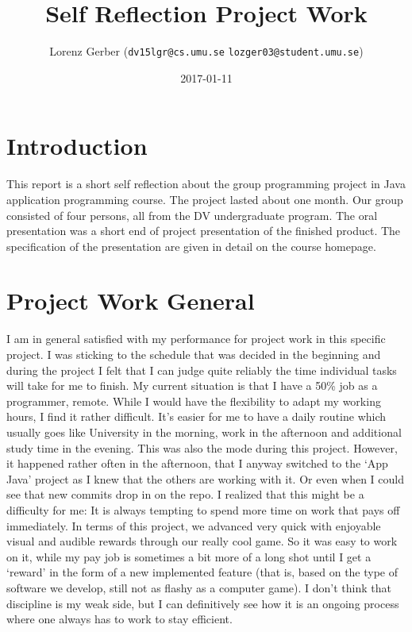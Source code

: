 \documentclass[a4paper,11pt,twoside]{article}
\title{Self Reflection Project Work}
\author{Lorenz Gerber ({\tt{dv15lgr@cs.umu.se}} {\tt{lozger03@student.umu.se}})}
\date{2017-01-11}
\begin{document}
\lstset{language=C}
\maketitle
\thispagestyle{empty}
\newpage
\tableofcontents
\thispagestyle{empty}
\newpage

\clearpage
{}

\section{Introduction}
This report is a short self reflection about the group programming project in Java application programming course. The project lasted about one month. Our group consisted of four persons, all from the DV undergraduate program. The oral presentation was a short end of project presentation of the finished product. The specification of the presentation are given in detail on the course homepage.

\section{Project Work General}
I am in general satisfied with my performance for project work in this specific project. I was sticking to the schedule that was decided in the beginning and during the project I felt that I can judge quite reliably the time individual tasks will take for me to finish.
My current situation is that I have a 50\% job as a programmer, remote. While I would have the flexibility to adapt my working hours, I find it rather difficult. It's easier for me to have a daily routine which usually goes like University in the morning, work in the afternoon and additional study time in the evening. This was also the mode during this project. However, it happened rather often in the afternoon, that I anyway switched to the `App Java' project as I knew that the others are working with it. Or even when I could see that new commits drop in on the repo. I realized that this might be a difficulty for me: It is always tempting to spend more time on work that pays off immediately. In terms of this project, we advanced very quick with enjoyable visual and audible rewards through our really cool game. So it was easy to work on it, while my pay job is sometimes a bit more of a long shot until I get a `reward' in the form of a new implemented feature (that is, based on the type of software we develop, still not as flashy as a computer game).
I don't think that discipline is my weak side, but I can definitively see how it is an ongoing process where one always has to work to stay efficient. 
\end{document}

